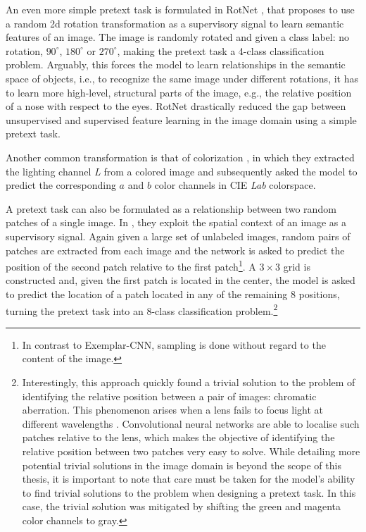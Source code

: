 An even more simple pretext task is formulated in RotNet \cite{gidaris2018unsupervised}, that proposes to use a random 2d rotation transformation as a supervisory signal to learn semantic features of an image.
The image is randomly rotated and given a class label: no rotation, $90^\circ$, $180^\circ$ or $270^\circ$, making the pretext task a 4-class classification problem.
Arguably, this forces the model to learn relationships in the semantic space of objects, i.e., to recognize the same image under different rotations, it has to learn more high-level, structural parts of the image, e.g., the relative position of a nose with respect to the eyes.
RotNet drastically reduced the gap between unsupervised and supervised feature learning in the image domain using a simple pretext task.

Another common transformation is that of colorization \cite{zhang_colorful_2016}, in which they extracted the lighting channel \textit{L} from a colored image and subsequently asked the model to predict the corresponding $a$ and $b$ color channels in CIE \textit{Lab} colorspace.

A pretext task can also be formulated as a relationship between two random patches of a single image. In \cite{doersch2015unsupervised}, they exploit the spatial context of an image as a supervisory signal.
Again given a large set of unlabeled images, random pairs of patches are extracted from each image and the network is asked to predict the position of the second patch relative to the first patch\footnote{In contrast to Exemplar-CNN, sampling is done without regard to the content of the image.}.
A $3\times 3$ grid is constructed and, given the first patch is located in the center, the model is asked to predict the location of a patch located in any of the remaining 8 positions, turning the pretext task into an 8-class classification problem.\footnote{
Interestingly, this approach quickly found a trivial solution to the problem of identifying the relative position between a pair of images: chromatic aberration.
This phenomenon arises when a lens fails to focus light at different wavelengths \cite{brewster_treatise_1835}.
Convolutional neural networks are able to localise such patches relative to the lens, which makes the objective of identifying the relative position between two patches very easy to solve.
While detailing more potential trivial solutions in the image domain is beyond the scope of this thesis, it is important to note that care must be taken for the model's ability to find trivial solutions to the problem when designing a pretext task.
In this case, the trivial solution was mitigated by shifting the green and magenta color channels to gray.
}

